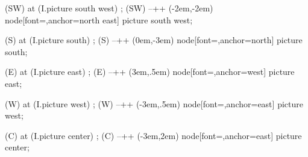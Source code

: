{{     (SW) at (I.picture south west) {};
     (SW) --++ (-2em,-2em) node[font=\tiny,anchor=north east] {picture south west};

     (S) at (I.picture south) {};
     (S) --++ (0em,-3em) node[font=\tiny,anchor=north] {picture south};

     (E) at (I.picture east) {};
     (E) --++ (3em,.5em) node[font=\tiny,anchor=west] {picture east};

     (W) at (I.picture west) {};
     (W) --++ (-3em,.5em) node[font=\tiny,anchor=east] {picture west};

     (C) at (I.picture center) {};
     (C) --++ (-3em,2em) node[font=\tiny,anchor=east] {picture center};
  }
}
